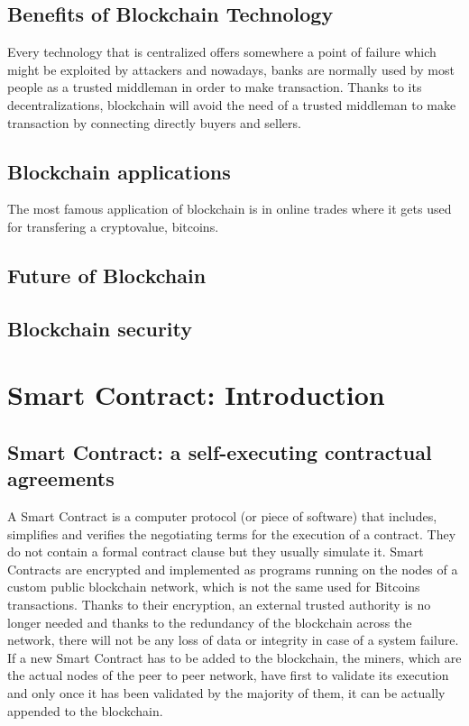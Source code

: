 \subsection{Benefits of Blockchain Technology}
Every technology that is centralized offers somewhere a point of failure which might be exploited by attackers and nowadays, banks are normally used by most people as a trusted middleman in order to make transaction.
Thanks to its decentralizations, blockchain will avoid the need of a trusted middleman to make transaction by connecting directly buyers and sellers.

\subsection{Blockchain applications}
The most famous application of blockchain is in online trades where it gets used for transfering a cryptovalue, bitcoins.


\subsection{Future of Blockchain}

\subsection{Blockchain security}


\section{Smart Contract: Introduction}
\subsection{Smart Contract: a self-executing contractual agreements}
A Smart Contract is a computer protocol (or piece of software) that includes, simplifies and verifies the negotiating terms for the execution of a contract. They do not contain a formal contract clause but they usually simulate it.
Smart Contracts are encrypted and implemented as programs running on the nodes of a custom public blockchain network, which is not the same used for Bitcoins transactions. Thanks to their encryption, an external trusted authority is no longer needed and thanks to the redundancy of the blockchain across the network, there will not be any loss of data or integrity in case of a system failure.
If a new Smart Contract has to be added to the blockchain, the miners, which are the actual nodes of the peer to peer network, have first to validate its execution and only once it has been validated by the majority of them, it can be actually appended to the blockchain.
